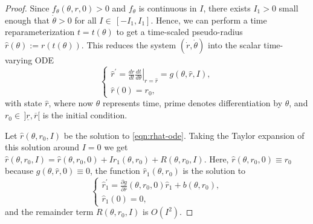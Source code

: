 \documentclass[journal,twoside,web, twocolumn,draftcls]{ieeecolor}
\begin{document}
\begin{proof}
    Since \(f_\theta(\theta,r,0) > 0\) and \(f_\theta\)
    is continuous in \(I\), there exists 
    \(I_1 > 0\) small enough that \(\dot{\theta} > 0\) for all
    \(I \in \, [-I_1,I_1]\).
    Hence, we can perform a time reparameterization \(t = t(\theta)\) to get a
    time-scaled pseudo-radius \(\hat{r}(\theta) := r(t(\theta))\).
    This reduces the system \((\dot{r},\dot{\theta})\) into the scalar
    time-varying ODE
    \begin{equation}\label{eqn:rhat-ode}
        \begin{cases}
            \hat{r}^\prime= \left.\frac{dr}{dt} \frac{dt}{d\theta}\right|_{r =
                \hat{r}} = 
            g(\theta,\hat{r},I)
            , \\
            \hat{r}(0) = r_0
            ,
        \end{cases}
    \end{equation}
    with state \(\hat{r}\), where now
    \(\theta\) represents time,
    prime denotes differentiation by \(\theta\), and
    \(r_0 \in \, ]\underline{r},\overline{r}[\) is the initial condition.

    Let \(\hat{r}(\theta,r_0,I)\) be the solution to \eqref{eqn:rhat-ode}.
    Taking the Taylor expansion of this solution around \(I = 0\) we get
    \(\hat{r}(\theta,r_0,I) = \hat{r}(\theta,r_0,0) + I\hat{r}_1(\theta,r_0) 
    + R(\theta,r_0,I)\). 
    Here, \(\hat{r}(\theta,r_0,0) \equiv r_0\) because
    \(g(\theta,\hat{r},0) \equiv 0\),
    the function \(\hat{r}_1(\theta,r_0)\) is the solution to
    \begin{equation}\label{eqn:r1-hat-prime}
        \begin{cases}
        \hat{r}_1^\prime = 
        \frac{\partial g}{\partial \hat{r}}(\theta,r_0,0)\hat{r}_1 +
        b(\theta,r_0)
        , \\
        \hat{r}_1(0) = 0
        ,
    \end{cases}
    \end{equation}
    and the remainder term \(R(\theta,r_0,I)\) is \(O(I^2)\).


\end{proof}
\end{document}
